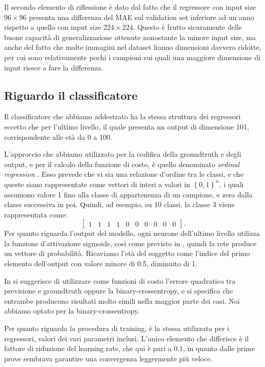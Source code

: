 Il secondo elemento di riflessione è dato dal fatto che il regressore con input size $96 \times 96$ presenta una differenza del MAE sul validation set inferiore ad un anno rispetto a quello con input size $224 \times 224$. Questo è frutto sicuramente delle buone capacità di generalizzazione ottenute nonostante la minore input size, ma anche del fatto che molte immagini nel dataset hanno dimensioni davvero ridotte, per cui sono relativamente pochi i campioni sui quali una maggiore dimensione di input riesce a fare la differenza.


\subsection{Riguardo il classificatore}

Il classificatore che abbiamo addestrato ha la stessa struttura dei regressori eccetto che per l'ultimo livello, il quale presenta un output di dimensione 101, corrispondente alle età da 0 a 100. 

L'approccio che abbiamo utilizzato per la codifica della groundtruth e degli output, e per il calcolo della funzione di costo, è quello denominato \emph{ordinal regression} \cite{ordinalregression}. Esso prevede che vi sia una relazione d'ordine tra le classi, e che queste siano rappresentate come vettori di interi a valori in $\left\{0,1\right\}^n$, i quali assumono valore 1 fino alla classe di appartenenza di un campione, e zero dalla classe successiva in poi. Quindi, ad esempio, su 10 classi, la classe 3 viene rappresentata come:
\begin{displaymath}
    \begin{bmatrix}
    1 & 1 & 1 & 1 & 0 & 0 & 0 & 0 & 0 & 0
    \end{bmatrix}.
\end{displaymath}
Per quanto riguarda l'output del modello, ogni neurone dell'ultimo livello utilizza la funzione d'attivazione sigmoide, così come previsto in \cite{ordinalregression}, quindi la rete produce un vettore di probabilità. Ricaviamo l'età del soggetto come l'indice del primo elemento dell'output con valore minore di 0.5, diminuito di 1. 

In \cite{ordinalregression} si suggerisce di utilizzare come funzioni di costo l'errore quadratico tra previsione e groundtruth oppure la binary-crossentropy, e si specifica che entrambe producono risultati molto simili nella maggior parte dei casi. Noi abbiamo optato per la binary-crossentropy. 

Per quanto riguarda la procedura di training, è la stessa utilizzata per i regressori, valori dei vari parametri inclusi. L'unico elemento che differisce è il fattore di riduzione del learning rate, che qui è pari a $0.1$, in quanto dalle prime prove sembrava garantire una convergenza leggermente più veloce.
